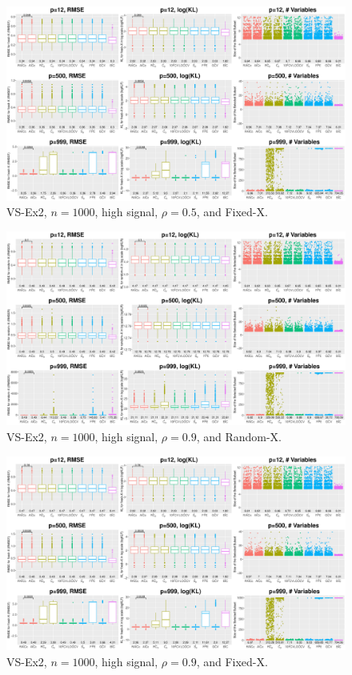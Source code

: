 \begin{figure}[!ht]
\centering
\includegraphics[width=\textwidth]{figures/supplement/fixedx_VS-Ex2_n1000_hsnr_rho05.eps}
\caption{VS-Ex2, $n=1000$, high signal, $\rho=0.5$, and Fixed-X.}
\end{figure}
\clearpage
\begin{figure}[!ht]
\centering
\includegraphics[width=\textwidth]{figures/supplement/randomx_VS-Ex2_n1000_hsnr_rho09.eps}
\caption{VS-Ex2, $n=1000$, high signal, $\rho=0.9$, and Random-X.}
\end{figure}
\begin{figure}[!ht]
\centering
\includegraphics[width=\textwidth]{figures/supplement/fixedx_VS-Ex2_n1000_hsnr_rho09.eps}
\caption{VS-Ex2, $n=1000$, high signal, $\rho=0.9$, and Fixed-X.}
\end{figure}
